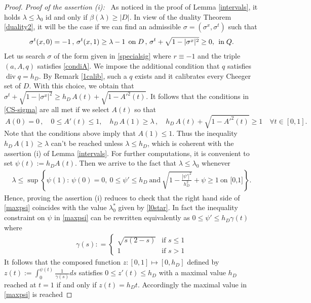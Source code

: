 \documentclass[reqno,11pt]{amsart}
\theoremstyle{definition}
\numberwithin{equation}{section}
\DeclareMathOperator{\Div}{div}
\newcommand{\tinm}[1]{\text{\;#1\;}}
\newcommand{\1}{{{\bf 1}\kern-0,28em\rm l}}
\def\l{\lambda}
\begin{document}
\begin{proof}
\noindent
\emph{Proof of the assertion (i): }\ As noticed in the proof of Lemma \ref{intervals}, it holds $\l\le \l_0$ id and only if $\beta(\l)\ge |D|$.  In view of the duality Theorem \ref{duality2}, 
it will be the case if we can find an admissible $\sigma=(\sigma^x,\sigma^t)$ such that 
\begin{gather}\label{CS-sigma}
 \sigma^t(x,0) = -1\, , \, \sigma^t(x,1) \ge \lambda -1 \, \tinm{on} D \, , \, \sigma^t + \sqrt{1- |\sigma^x|^2} \ge 0 ,
 \,  \tinm{in} Q.
\end{gather}
Let us search $\sigma$ of the form given in \eqref{specialsig} where $r\equiv -1$ and the triple $(a,A,q)$ satisfies \eqref{condiA}. We impose the additional  condition that $q$ satisfies $\Div q=h_D$. By  Remark \ref{1calib}, such a $q$ exists and it calibrates every  Cheeger set of $D$. With this choice, we obtain
 that $\sigma^t + \sqrt{1- |\sigma^x|^2} \ge h_D\, A(t)  + \sqrt{1- A'^2(t) }$. It follows that
 the conditions in \eqref{CS-sigma}  are all met if we  select $A(t)$ so that
$$ \,  A(0)=0 \, ,\quad 0\le A'(t)\le 1 ,  \quad  h_D\, A(1)  \ge \l \, , \quad  h_D\, A(t)  + \sqrt{1- A'^2(t) } \ge 1 \quad \forall t \in[0,1].$$
Note  that the conditions above imply that   $A(1) \le 1$. Thus   the inequality $h_D\, A(1)  \ge \l$ can't be reached unless $\l \le h_D$, 
which is coherent with the assertion (i) of Lemma \ref{intervals}. For further computations, it is convenient to set
 $\psi(t):=h_D A(t)$.  Then we arrive to the fact that  $\l\le \l_0$ whenever
\begin{align}
\lambda \le  \sup \left\{ \psi(1) :\,  \psi(0 ) = 0, \ 0\le \psi'\le h_D  \ \text{and}\ \sqrt{1-\frac{|\psi'|^2}{h_D^2}} + \psi \ge 1 \ \text{on [0,1]}\right\}.\label{maxpsi}
\end{align}
Hence,  proving the assertion (i) reduces to check that the right hand side of \eqref{maxpsi} coincides with the value $\l_0^*$ given by \eqref{l0star}.
In fact the inequality constraint on $\psi$ in \eqref{maxpsi} can be rewritten equivalently as 
$0\le \psi' \le h_D \gamma(t)$ where
\begin{align*}
\gamma(s): =
\begin{cases}
\sqrt{s(2-s)} &\text{if } s \le 1\\
1 &\text{if } s>1
\end{cases}
\end{align*}
It follows that the composed function $z: [0,1]\mapsto [0,h_D]$ defined by 
$ z(t) := \int_0^{\psi(t)} \frac{1}{\gamma(s)} ds $
satisfies $0\le z'(t) \le h_D$ with a maximal value $h_D$ reached at $t=1$ if and only if $z(t)=h_D t$. Accordingly the maximal value in \eqref{maxpsi} is reached

\end{proof}
\end{document}
